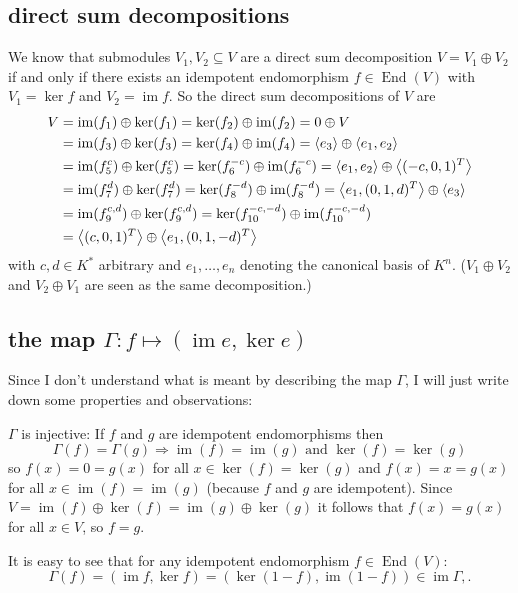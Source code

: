 \documentclass[a4paper,10pt]{article}
\newcommand{\End}{\operatorname{End}}
\newcommand{\img}{\operatorname{im}}
\newcommand{\gen}[1]{\left\langle#1\right\rangle}
\begin{document}
\subsection*{direct sum decompositions}
We know that submodules $V_1, V_2 \subseteq V$ are a direct sum decomposition \mbox{$V = V_1 \oplus V_2$} if and only if there exists an idempotent endomorphism $f \in \End(V)$ with $V_1 = \ker f$ and $V_2 = \img f$. So the direct sum decompositions of $V$ are
\begin{align}
 V
 &= \img(f_1) \oplus \ker(f_1)
 = \ker(f_2) \oplus \img(f_2)
 = 0 \oplus V \\
 &= \img(f_3) \oplus \ker(f_3)
 = \ker(f_4) \oplus \img(f_4)
 = \gen{e_3} \oplus \gen{e_1, e_2} \\
 &= \img(f^c_5) \oplus \ker(f^c_5)
 = \ker(f^{-c}_6) \oplus \img(f^{-c}_6)
 = \gen{e_1, e_2} \oplus \gen{(-c,0,1)^T}\\
 &= \img(f^d_7) \oplus \ker(f^d_7)
 = \ker(f^{-d}_8) \oplus \img(f^{-d}_8)
 = \gen{e_1, (0,1,d)^T} \oplus \gen{e_3} \\
 &= \img(f^{c,d}_9) \oplus \ker(f^{c,d}_9)
 = \ker(f^{-c,-d}_{10}) \oplus \img(f^{-c,-d}_{10}) \notag \\
 &= \gen{(c,0,1)^T} \oplus \gen{e_1, (0,1,-d)^T}  
\end{align}
with $c, d \in K^*$ arbitrary and $e_1, \ldots, e_n$ denoting the canonical basis of $K^n$. ($V_1 \oplus V_2$ and $V_2 \oplus V_1$ are seen as the same decomposition.) 

\subsection*{the map $\Gamma: f \mapsto (\img e, \ker e)$}
Since I don’t understand what is meant by describing the map $\Gamma$, I will just write down some properties and observations:

$\Gamma$ is injective: If $f$ and $g$ are idempotent endomorphisms then
\[
 \Gamma(f) = \Gamma(g)
 \Rightarrow \img(f) = \img(g) \text{ and } \ker(f) = \ker(g)
\]
so $f(x) = 0 = g(x)$ for all $x \in \ker(f) = \ker(g)$ and $f(x) = x = g(x)$ for all $x \in \img(f) = \img(g)$ (because $f$ and $g$ are idempotent). Since $V = \img(f) \oplus \ker(f) = \img(g) \oplus \ker(g)$ it follows that $f(x) = g(x)$ for all $x \in V$, so $f = g$.

It is easy to see that for any idempotent endomorphism $f \in \End(V)$:
\[
 \Gamma(f) = (\img f, \ker f) = (\ker (1-f), \img (1-f))  \in \img \Gamma,.
\]
\end{document}
